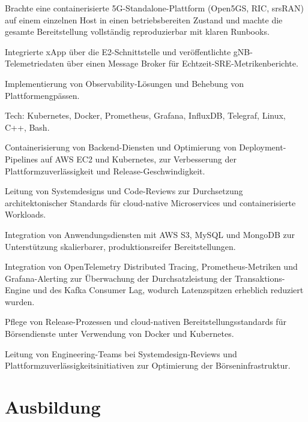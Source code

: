 \documentclass[10pt,a4paper]{resume}
\begin{document}
\bullets
  \item Brachte eine containerisierte 5G-Standalone-Plattform (Open5GS, RIC, srsRAN) auf einem einzelnen Host in einen betriebsbereiten Zustand und machte die gesamte Bereitstellung vollständig reproduzierbar mit klaren Runbooks.
  \item Integrierte xApp über die E2-Schnittstelle und veröffentlichte gNB-Telemetriedaten über einen Message Broker für Echtzeit-SRE-Metrikenberichte.
  \item Implementierung von Observability-Lösungen und Behebung von Plattformengpässen.
  \item Tech: Kubernetes, Docker, Prometheus, Grafana, InfluxDB, Telegraf, Linux, C++, Bash.
\bulletsend
\vspace{1.5pt}
\bullets
  \item Containerisierung von Backend-Diensten und Optimierung von Deployment-Pipelines auf AWS EC2 und Kubernetes, zur Verbesserung der Plattformzuverlässigkeit und Release-Geschwindigkeit.
  \item Leitung von Systemdesigns und Code-Reviews zur Durchsetzung architektonischer Standards für cloud-native Microservices und containerisierte Workloads.
  \item Integration von Anwendungsdiensten mit AWS S3, MySQL und MongoDB zur Unterstützung skalierbarer, produktionsreifer Bereitstellungen.
\bulletsend
\vspace{1.5pt}
\bullets
  \item Integration von OpenTelemetry Distributed Tracing, Prometheus-Metriken und Grafana-Alerting zur Überwachung der Durchsatzleistung der Transaktions-Engine und des Kafka Consumer Lag, wodurch Latenzspitzen erheblich reduziert wurden.
  \item Pflege von Release-Prozessen und cloud-nativen Bereitstellungsstandards für Börsendienste unter Verwendung von Docker und Kubernetes.
  \item Leitung von Engineering-Teams bei Systemdesign-Reviews und Plattformzuverlässigkeitsinitiativen zur Optimierung der Börseninfrastruktur.
\bulletsend
\vspace{1.5pt}

\section{Ausbildung}
\end{document}
